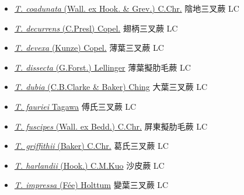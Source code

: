\begin{itemize}
  \begin{itemize}
        \item[] \href{http://www.theplantlist.org/tpl1.1/search?q=Tectaria+coadunata}{\textit{T. coadunata} (Wall. ex Hook. \& Grev.) C.Chr.}   陰地三叉蕨   LC
        \item[] \href{http://www.theplantlist.org/tpl1.1/search?q=Tectaria+decurrens}{\textit{T. decurrens} (C.Presl) Copel.}   翅柄三叉蕨   LC
        \item[] \href{http://www.theplantlist.org/tpl1.1/search?q=Tectaria+devexa}{\textit{T. devexa} (Kunze) Copel.}   薄葉三叉蕨   LC
        \item[] \href{http://www.theplantlist.org/tpl1.1/search?q=Tectaria+dissecta}{\textit{T. dissecta} (G.Forst.) Lellinger}   薄葉擬肋毛蕨   LC
        \item[] \href{http://www.theplantlist.org/tpl1.1/search?q=Tectaria+dubia}{\textit{T. dubia} (C.B.Clarke \& Baker) Ching}   大葉三叉蕨   LC
        \item[] \href{http://www.theplantlist.org/tpl1.1/search?q=Tectaria+fauriei}{\textit{T. fauriei} Tagawa}   傅氏三叉蕨   LC
        \item[] \href{http://www.theplantlist.org/tpl1.1/search?q=Tectaria+fuscipes}{\textit{T. fuscipes} (Wall. ex Bedd.) C.Chr.}   屏東擬肋毛蕨   LC
        \item[] \href{http://www.theplantlist.org/tpl1.1/search?q=Tectaria+griffithii}{\textit{T. griffithii} (Baker) C.Chr.}   葛氏三叉蕨   LC
        \item[] \href{http://www.theplantlist.org/tpl1.1/search?q=Tectaria+harlandii}{\textit{T. harlandii} (Hook.) C.M.Kuo}   沙皮蕨   LC
        \item[] \href{http://www.theplantlist.org/tpl1.1/search?q=Tectaria+impressa}{\textit{T. impressa} (Fée) Holttum}   變葉三叉蕨   LC

\end{itemize}
\end{itemize}
